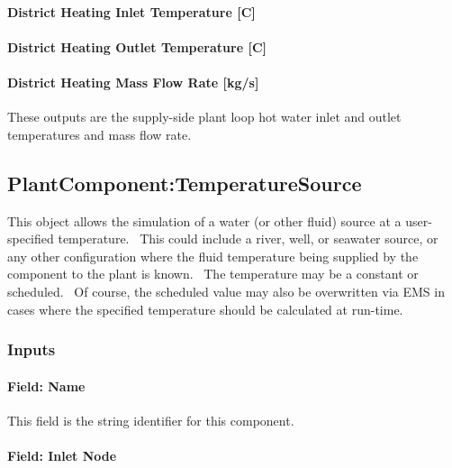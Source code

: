 \paragraph{District Heating Inlet Temperature {[}C{]}}\label{district-heating-inlet-temperature-c}

\paragraph{District Heating Outlet Temperature {[}C{]}}\label{district-heating-outlet-temperature-c}

\paragraph{District Heating Mass Flow Rate {[}kg/s{]}}\label{district-heating-mass-flow-rate-kgs}

These outputs are the supply-side plant loop hot water inlet and outlet temperatures and mass flow rate.

\subsection{PlantComponent:TemperatureSource}\label{plantcomponenttemperaturesource}

This object allows the simulation of a water (or other fluid) source at a user-specified temperature.~ This could include a river, well, or seawater source, or any other configuration where the fluid temperature being supplied by the component to the plant is known.~ The temperature may be a constant or scheduled.~ Of course, the scheduled value may also be overwritten via EMS in cases where the specified temperature should be calculated at run-time.

\subsubsection{Inputs}\label{inputs-18-006}

\paragraph{Field: Name}\label{field-name-17-005}

This field is the string identifier for this component.

\paragraph{Field: Inlet Node}\label{field-inlet-node-000}

